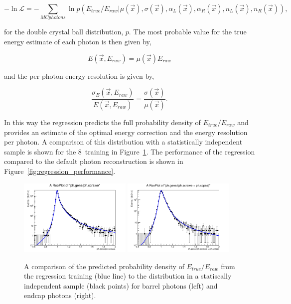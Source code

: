 \begin{equation}
  -\ln \mathcal{L} = - \sum_{MC photons} \ln p(E_{true}/E_{raw} | \mu(\vec{x}),\sigma(\vec{x}),\alpha_{L}(\vec{x}),\alpha_{R}(\vec{x}),n_{L}(\vec{x}),n_{R}(\vec{x})),
\end{equation}

for the double crystal ball distribution, $p$. The most probable value for the true energy estimate of each photon is then given by,

\begin{equation}
  E(\vec{x},E_{raw}) = \mu(\vec{x})E_{raw}
\end{equation}

and the per-photon energy resolution is given by, 

\begin{equation}
  \frac{\sigma_{E}(\vec{x},E_{raw})}{E(\vec{x},E_{raw})} = \frac{\sigma(\vec{x})}{\mu(\vec{x})}.
\end{equation}

In this way the regression predicts the full probability density of $E_{true}/E_{raw}$ and provides an estimate of the optimal energy correction and the energy resolution per photon. A comparison of this distribution with a statistically independent \MC sample is shown for the 8~\TeV training in Figure~\ref{fig:regression_training}. The performance of the regression compared to the default photon reconstruction is shown in Figure~\ref{fig:regression_performance}.

\begin{figure}
  \includegraphics[width=0.48\textwidth]{analysis_comps/plots/regression_barrel.pdf}
  \includegraphics[width=0.48\textwidth]{analysis_comps/plots/regression_endcap.pdf}
  \caption{A comparison of the predicted probability density of $E_{true}/E_{raw}$ from the regression training (blue line) to the distribution in a statiscally independent \MC sample (black points) for barrel photons (left) and endcap photons (right). }
  \label{fig:regression_training}
\end{figure}

